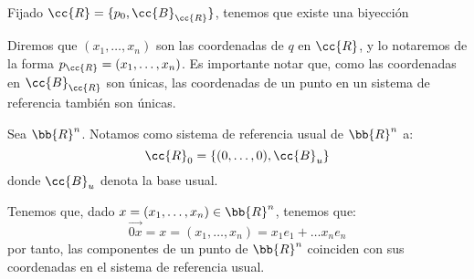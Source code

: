 Fijado $\cc{R}=\{p_0, \cc{B}_{\cc{R}}\}$, tenemos que existe una biyección

Diremos que $(x_1,\dots, x_n)$ son las coordenadas de $q$ en $\cc{R}$, y lo notaremos de la forma $p_{\cc{R}}=(x_1,\dots, x_n)$.
Es importante notar que, como las coordenadas en $\cc{B}_{\cc{R}}$ son únicas, las coordenadas de un punto en un sistema de referencia también son únicas.

\begin{definicion} Sea $\bb{R}^n$. Notamos como sistema de referencia usual de $\bb{R}^n$ a:
\begin{equation*}
    \cc{R}_0=\{(0,\dots, 0),\cc{B}_u\}
\end{equation*}
donde $\cc{B}_u$ denota la base usual.
\end{definicion}
Tenemos que, dado $x=(x_1,\dots,x_n)\in \bb{R}^n$, tenemos que:
\begin{equation*}
    \vec{0x} = x = (x_1,\dots,x_n) = x_1e_1+\dots x_ne_n
\end{equation*}
por tanto, las componentes de un punto de $\bb{R}^n$ coinciden con sus coordenadas en el sistema de referencia usual.

